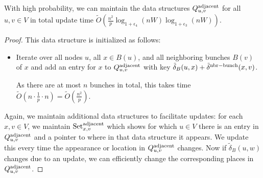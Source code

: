 \begin{lemma}\label{lm:adjacentDS}
    With high probability, we can maintain the data structures $Q^{\rm{adjacent}}_{u,v}$ for all $u,v\in V$ in total update time $ \tilde O (\tfrac{n^2}{p}\log_{1+\epsilon_4}(nW)\log_{1+\epsilon_3}(nW)) $.
\end{lemma}
\begin{proof}

    This data structure is initialized as follows:    
    \begin{itemize}
        \item Iterate over all nodes $ u $, all $ x \in B (u) $, and all neighboring bunches $ B (v) $ of $ x $ and add an entry for $x$ to $Q^{\rm{adjacent}}_{u,v}$ with key $\tilde\delta_B(u,x)+\tilde\delta^{\rm{nbr-bunch}}(x,v)$.
    
    As there are at most $ n $ bunches in total, this takes time $ \tilde O (n \cdot \tfrac{1}{p} \cdot n) = \tilde O (\tfrac{n^2}{ p}) $. 
    \end{itemize}
    Again, we maintain additional data structures to facilitate updates: for each $x,v\in V$, we maintain $\text{Set}_{x,v}^{\rm{adjacent}}$ which shows for which $u\in V$ there is an entry in $Q^{\rm{adjacent}}_{u,v}$ and a pointer to where in that data structure it appears. We update this every time the appearance or location in $Q^{\rm{adjacent}}_{u,v}$ changes. Now if $\tilde\delta_B(u,w)$ changes due to an update, we can efficiently change the corresponding places in $Q^{\rm{adjacent}}_{u,v}$. 
    

\end{proof}
